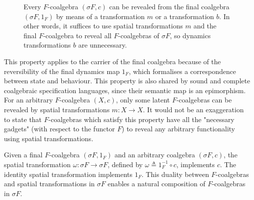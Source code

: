 \begin{figure}[t] 
    \centering
    \caption{Every $F$-coalgebra $(\sigma F, c)$ can be revealed from the final coalgebra $(\sigma F,1_F)$ by means of a transformation $m$ or a transformation $b$. In other words, it suffices to use spatial transformations $m$ and the final $F$-coalgebra to reveal all $F$-coalgebras of $\sigma F$, so dynamics transformations $b$ are unnecessary.}
    \label{fig:FinalEquivalence} 
\end{figure}
This property applies to the carrier of the final coalgebra because of the reversibility of the final dynamics map $1_F$, which formalises a correspondence between state and behaviour. This property is also shared by sound and complete coalgebraic specification languages, since their semantic map is an epimorphism. For an arbitrary $F$-coalgebra $(X,c)$, only some latent $F$-coalgebras can be revealed by spatial transformations $m\colon X\rightarrow X$. It would not be an exaggeration to state that $F$-coalgebras which satisfy this property have all the "necessary gadgets" (with respect to the functor $F$) to reveal any arbitrary functionality using spatial transformations. 

Given a final $F$-coalgebra $(\sigma F, 1_F)$ and an arbitrary coalgebra $(\sigma F, c)$, the spatial transformation $\omega\colon \sigma F\rightarrow \sigma F$, defined by $\omega\triangleq 1_F^{-1}\circ c$, implements $c$. The identity spatial transformation implements $1_F$. This duality between $F$-coalgebras and spatial transformations in $\sigma F$ enables a natural composition of $F$-coalgebras in $\sigma F$.

